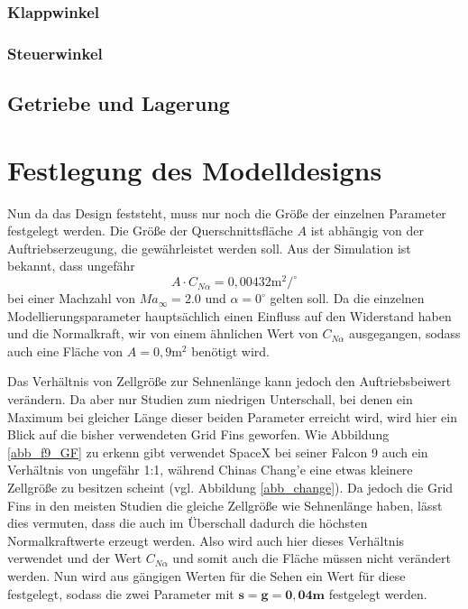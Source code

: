\subsubsection{Klappwinkel}
\subsubsection{Steuerwinkel}
\subsection{Getriebe und Lagerung}

\section{Festlegung des Modelldesigns}\label{sec:modelldesign}
Nun da das Design feststeht, muss nur noch die Größe der einzelnen Parameter festgelegt werden. Die Größe der Querschnittsfläche $A$ ist abhängig von der Auftriebserzeugung, die gewährleistet werden soll. Aus der Simulation ist bekannt, dass ungefähr
\begin{equation}
	A \cdot C_{N\alpha}= 0,00432 \mathrm{m}^2/^\circ
\end{equation}
bei einer Machzahl von $Ma_\infty = 2.0$ und $\alpha = 0^\circ$ gelten soll. Da die einzelnen Modellierungsparameter hauptsächlich einen Einfluss auf den Widerstand haben und die Normalkraft, wir von einem ähnlichen Wert von $C_{N\alpha}$ ausgegangen, sodass auch eine Fläche von $A=0,9\mathrm{m}^2$ benötigt wird.

Das Verhältnis von Zellgröße zur Sehnenlänge kann jedoch den Auftriebsbeiwert verändern. Da aber nur Studien zum niedrigen Unterschall, bei denen ein Maximum bei gleicher Länge dieser beiden Parameter erreicht wird, wird hier ein Blick auf die bisher verwendeten Grid Fins geworfen. Wie Abbildung \ref{abb_f9_GF} zu erkenn gibt verwendet SpaceX bei seiner Falcon 9 auch ein Verhältnis von ungefähr 1:1, während Chinas Chang'e eine etwas kleinere Zellgröße zu besitzen scheint (vgl. Abbildung \ref{abb_change}). Da jedoch die Grid Fins in den meisten Studien die gleiche Zellgröße wie Sehnenlänge haben, lässt dies vermuten, dass die auch im Überschall dadurch die höchsten Normalkraftwerte erzeugt werden. Also wird auch hier dieses Verhältnis verwendet und der Wert $C_{N\alpha}$ und somit auch die Fläche müssen nicht verändert werden. Nun wird aus gängigen Werten für die Sehen ein Wert für diese festgelegt, sodass die zwei Parameter mit $\mathbf{s=g=0,04m}$ festgelegt werden.

